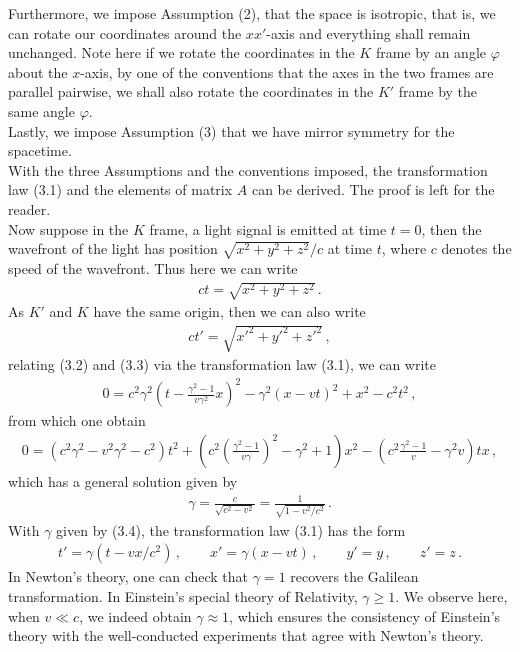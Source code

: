 \documentclass[11pt, onesided]{book}
\theoremstyle{break}
\theoremstyle{break}
\begin{document}
Furthermore, we impose Assumption (2), that the space is isotropic, that is, we can rotate our coordinates around the $xx'$-axis and everything shall remain unchanged. Note here if we rotate the coordinates in the $K$ frame by an angle $\varphi$ about the $x$-axis, by one of the conventions that the axes in the two frames are parallel pairwise, we shall also rotate the coordinates in the $K'$ frame by the same angle $\varphi$. \\

Lastly, we impose Assumption (3) that we have mirror symmetry for the spacetime. \\

With the three Assumptions and the conventions imposed, the transformation law (3.1) and the elements of matrix $A$ can be derived. The proof is left for the reader.\\

Now suppose in the $K$ frame, a light signal is emitted at time $t= 0$, then the wavefront of the light has position $\sqrt{x^2 + y^2 + z^2}/c$ at time $t$, where $c$ denotes the speed of the wavefront. Thus here we can write
\begin{align}
ct = \sqrt{x^2 + y^2 + z^2}\,.
\end{align}
As $K'$ and $K$ have the same origin, then we can also write
\begin{align}
ct' = \sqrt{x'^2 + y'^2 + z'^2}\,,
\end{align}
relating (3.2) and (3.3) via the transformation law (3.1), we can write
\begin{align*}
0 = c^2 \gamma^2 \left( t - \frac{\gamma^2 - 1}{v\gamma^2}x\right)^2 - \gamma^2 \left( x-vt\right)^2 +x^2 -c^2 t^2\,,
\end{align*}
from which one obtain
\begin{align*}
0 = \left( c^2 \gamma^2 - v^2 \gamma^2 -c^2\right) t^2 + \left( c^2 \left( \frac{\gamma^2 - 1}{v\gamma}\right)^2 - \gamma^2  + 1 \right) x^2 - \left( c^2 \frac{\gamma^2 - 1}{v} - \gamma^2 v\right)tx \,,
\end{align*}
which has a general solution given by
\begin{align}
\gamma = \frac{c}{\sqrt{c^2 - v^2}} =\frac{1}{\sqrt{1-v^2/c^2}} \,.
\end{align}
With $\gamma$ given by (3.4), the transformation law (3.1) has the form
\begin{align}
t' = \gamma(t - vx/c^2)\,,\qquad
x' = \gamma(x-vt)\,,\qquad
y' = y\,,\qquad
z' = z\,.
\end{align}
In Newton's theory, one can check that $\gamma = 1$ recovers the Galilean transformation. In Einstein's special theory of Relativity, $\gamma \geq 1$. We observe here, when $v\ll c$, we indeed obtain $\gamma \approx 1$, which ensures the consistency of Einstein's theory with the well-conducted experiments that agree with Newton's theory. \\
\end{document}
